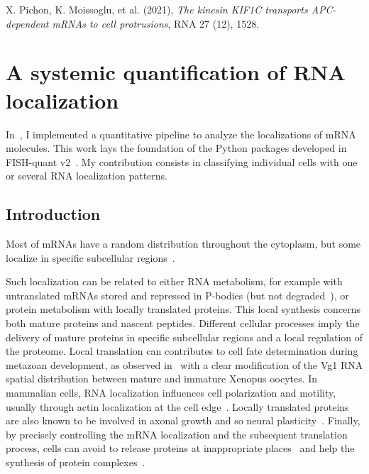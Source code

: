 \begin{center}
	\color{green}
	X. Pichon, K. Moissoglu, et al. (2021), \textit{The kinesin KIF1C transports APC-dependent mRNAs to cell protrusions}, RNA 27 (12), 1528.
\end{center}

\section{A systemic quantification of RNA localization}
\label{sec:general_pattern_recognition}

In~\cite{CHOUAIB_2020}, I implemented a quantitative pipeline to analyze the localizations of \ac{mRNA} molecules.
This work lays the foundation of the Python packages developed in FISH-quant v2~\cite{Imbert_fq_2022}.
My contribution consists in classifying individual cells with one or several \ac{RNA} localization patterns.

\subsection{Introduction}
\label{subsec:introduction_general_pattern}

Most of \ac{mRNA}s have a random distribution throughout the cytoplasm, but some localize in specific subcellular regions~\cite{Blower_2013, Jung_2014, Eliscovich_2017, Bovaird_2018}.

Such localization can be related to either \ac{RNA} metabolism, for example with untranslated \ac{mRNA}s stored and repressed in \ac{P-bodies} (but not degraded~\cite{Hubstenberger_2017}), or  protein metabolism with locally translated proteins.
This local synthesis concerns both mature proteins and nascent peptides.
Different cellular processes imply the delivery of mature proteins in specific subcellular regions and a local regulation of the proteome.
Local translation can contributes to cell fate determination during metazoan development, as observed in~\cite{melton_translocation_1987} with a clear modification of the Vg1 \ac{RNA} spatial distribution between mature and immature Xenopus oocytes.
In mammalian cells, \ac{RNA} localization influences cell polarization and motility, usually through actin localization at the cell edge~\cite{Lawrence_1986}.
Locally translated proteins are also known to be involved in axonal growth and so neural plasticity~\cite{VanDriesche_2018}.
Finally, by precisely controlling the \ac{mRNA} localization and the subsequent translation process, cells can avoid to release proteins at inappropriate places~\cite{Muller_myelin_2013} and help the synthesis of protein complexes~\cite{pichon_visualization_2016}.

